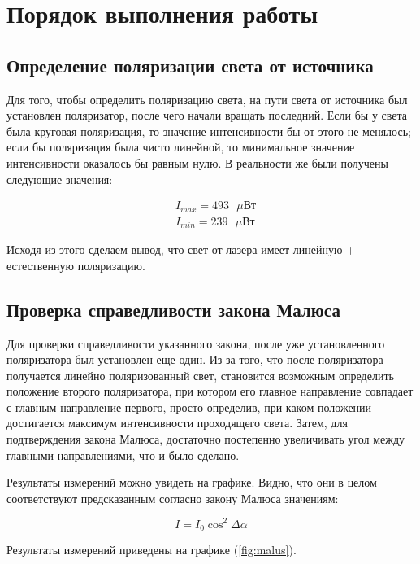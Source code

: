 \documentclass[a4paper, 12pt]{article}
\begin{document}
\section{Порядок выполнения работы}

\subsection{Определение поляризации света от источника}

Для того, чтобы определить поляризацию света, на пути света от источника был установлен поляризатор, после чего начали вращать последний. Если бы у света была круговая поляризация, то значение интенсивности бы от этого не менялось; если бы поляризация была чисто линейной, то минимальное значение интенсивности оказалось бы равным нулю. В реальности же были получены следующие значения:

\begin{align*}
	& I_{max} = 493 \text{ $\mu$Вт} \\
	& I_{min} = 239 \text{ $\mu$Вт}
\end{align*}

Исходя из этого сделаем вывод, что свет от лазера имеет линейную + естественную поляризацию.

\subsection{Проверка справедливости закона Малюса}

Для проверки справедливости указанного закона, после уже установленного поляризатора был установлен еще один. Из-за того, что после поляризатора получается линейно поляризованный свет, становится возможным определить положение второго поляризатора, при котором его главное направление совпадает с главным направление первого, просто определив, при каком положении достигается максимум интенсивности проходящего света. Затем, для подтверждения закона Малюса, достаточно постепенно увеличивать угол между главными направлениями, что и было сделано.

Результаты измерений можно увидеть на графике. Видно, что они в целом соответствуют предсказанным согласно закону Малюса значениям:

\begin{equation}
		I = I_0 \cos^2\Delta\alpha
		\label{eq:malus_law}
\end{equation}

Результаты измерений приведены на графике (\ref{fig:malus}).
\end{document}
